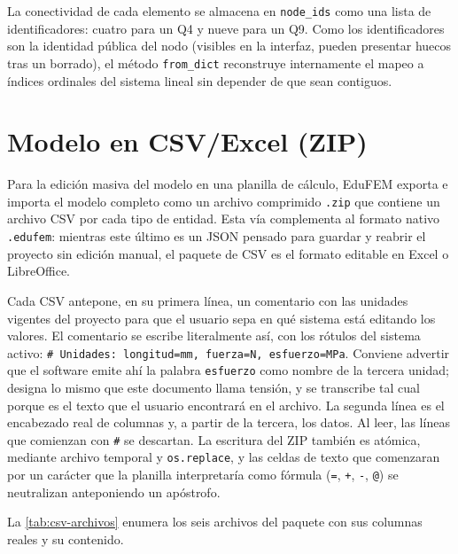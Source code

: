La conectividad de cada elemento se almacena en \texttt{node\_ids} como una lista de identificadores: cuatro para un Q4 y nueve para un Q9. Como los identificadores son la identidad pública del nodo (visibles en la interfaz, pueden presentar huecos tras un borrado), el método \texttt{from\_dict} reconstruye internamente el mapeo a índices ordinales del sistema lineal sin depender de que sean contiguos.

\section{Modelo en CSV/Excel (ZIP)}

Para la edición masiva del modelo en una planilla de cálculo, EduFEM exporta e importa el modelo completo como un archivo comprimido \texttt{.zip} que contiene un archivo CSV por cada tipo de entidad. Esta vía complementa al formato nativo \texttt{.edufem}: mientras este último es un JSON pensado para guardar y reabrir el proyecto sin edición manual, el paquete de CSV es el formato editable en Excel o LibreOffice.

Cada CSV antepone, en su primera línea, un comentario con las unidades vigentes del proyecto para que el usuario sepa en qué sistema está editando los valores. El comentario se escribe literalmente así, con los rótulos del sistema activo: \texttt{\# Unidades: longitud=mm, fuerza=N, esfuerzo=MPa}. Conviene advertir que el software emite ahí la palabra \texttt{esfuerzo} como nombre de la tercera unidad; designa lo mismo que este documento llama tensión, y se transcribe tal cual porque es el texto que el usuario encontrará en el archivo. La segunda línea es el encabezado real de columnas y, a partir de la tercera, los datos. Al leer, las líneas que comienzan con \texttt{\#} se descartan. La escritura del ZIP también es atómica, mediante archivo temporal y \texttt{os.replace}, y las celdas de texto que comenzaran por un carácter que la planilla interpretaría como fórmula (\texttt{=}, \texttt{+}, \texttt{-}, \texttt{@}) se neutralizan anteponiendo un apóstrofo.

La \autoref{tab:csv-archivos} enumera los seis archivos del paquete con sus columnas reales y su contenido.

